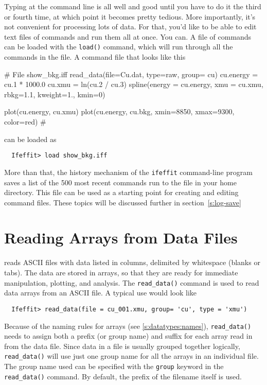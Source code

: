 \documentclass[11pt]{article}
\begin{document}
Typing at the command line is all well and good until you have to do it the
third or fourth time, at which point it becomes pretty tedious.  More
importantly, it's not convenient for processing lots of data.  For that,
you'd like to be able to edit text files of {\ifeffit} commands and run
them all at once.  You can.   A file of commands can be loaded with the
{\tt{load()}} command, which will run through all the commands in the
file.  A command file {} that looks like this
{\small{
\begin{VerbSBox}
 # File  show_bkg.iff 
 read_data(file=Cu.dat, type=raw, group= cu)
 cu.energy  = cu.1 * 1000.0
 cu.xmu     = ln(cu.2 / cu.3)
 spline(energy = cu.energy, xmu = cu.xmu, 
        rbkg=1.1, kweight=1., kmin=0)

 plot(cu.energy, cu.xmu)
 plot(cu.energy, cu.bkg, xmin=8850, xmax=9300,  
                color=red)
 #
\end{VerbSBox}
}}\noindent
can be loaded as
{\small\begin{verbatim} 
  Ifeffit> load show_bkg.iff
\end{verbatim}
}\noindent
More than that, the history mechanism of the {\tt{ifeffit}} command-line
program saves a list of the 500 most recent {\ifeffit} commands run to the
file {} in your home directory.  This file can be used
as a starting point for creating and editing command files.  These
topics will be discussed further in section~{\ref{s:log-save}}



\clearpage
\section{Reading Arrays from Data Files}\label{s:fileio}

{\ifeffit} reads ASCII files with data listed in columns, delimited by
whitespace (blanks or tabs).  The data are stored in {\ifeffit} arrays, so
that they are ready for immediate manipulation, plotting, and analysis.
The {\tt{read\_data()}} command is used to read data arrays from an ASCII
file.  A typical use would look like
{\small\begin{verbatim}
  Ifeffit> read_data(file = cu_001.xmu, group= 'cu', type = 'xmu')
\end{verbatim}}\noindent
Because of the naming rules for arrays (see \ref{s:datatypes:names}),
{\tt{read\_data()}} needs to assign both a prefix (or group name) and
suffix for each array read in from the data file.  Since data in a file is
usually grouped together logically, {\tt{read\_data()}} will use just one
group name for all the arrays in an individual file.  The group name used
can be specified with the {\tt{group}} keyword in the {\tt{read\_data()}}
command.  By default, the prefix of the filename itself is used.
\end{document}
